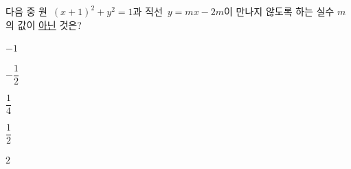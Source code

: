 다음 중 원~$(x+1)^2+y^2=1$과 직선~$y=mx-2m$이 만나지 않도록 하는 실수 $m$의 값이 \underline{아닌} 것은?
\begin{choices32}{\rule[-3ex]{0pt}{8ex}$-1$}{\rule[-3ex]{0pt}{8ex}$-\dfrac{1}{2}$}{\rule[-3ex]{0pt}{8ex}$\dfrac{1}{4}$}{\rule[-3ex]{0pt}{8ex}$\dfrac{1}{2}$}{\rule[-3ex]{0pt}{8ex}$2$}\end{choices32}
